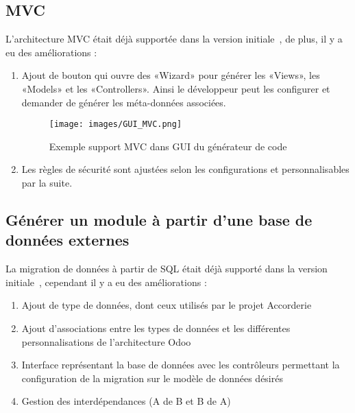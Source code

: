 \subsection{MVC}

L’architecture MVC était déjà supportée dans la version initiale~\cite{bluiksnot_repo}, de plus, il y a eu des améliorations : 

\begin{enumerate}
 \item Ajout de bouton qui ouvre des «Wizard» pour générer les «Views», les «Models» et les «Controllers». Ainsi le développeur peut les configurer et demander de générer les méta-données associées.
    \begin{figure}[htb]
    \centering
    \texttt{[image: images/GUI\_MVC.png]}
    \caption{Exemple support MVC dans GUI du générateur de code}
    \label{fig:dia_gui_mvc}
    \end{figure}
 \item Les règles de sécurité sont ajustées selon les configurations et personnalisables par la suite.
\end{enumerate}

\subsection{Générer un module à partir d’une base de données externes}


La migration de données à partir de SQL était déjà supporté dans la version initiale~\cite{bluiksnot_repo}, cependant il y a eu des améliorations : 

\begin{enumerate}
    \item Ajout de type de données, dont ceux utilisés par le projet Accorderie
    \item Ajout d'associations entre les types de données et les différentes personnalisations de l’architecture Odoo
    \item Interface représentant la base de données avec les contrôleurs permettant la configuration de la migration sur le modèle de données désirés
    \item Gestion des interdépendances (A de B et B de A)
\end{enumerate}

